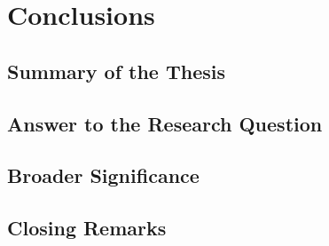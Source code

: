 
\section{Conclusions}
\subsection{Summary of the Thesis}
\subsection{Answer to the Research Question}
\subsection{Broader Significance}
\subsection{Closing Remarks}
